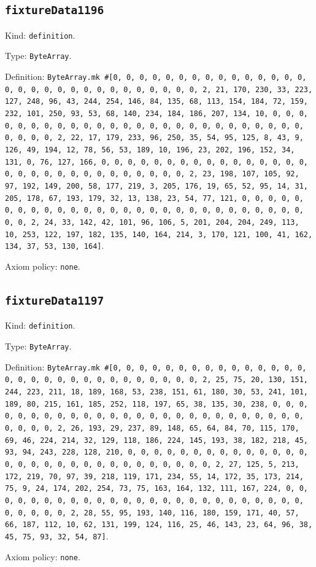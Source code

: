 \documentclass[11pt]{article}
\begin{document}
\subsection*{\texttt{fixtureData1196}}
\noindent Kind: \texttt{definition}.\par
\noindent Type: \texttt{ByteArray}.\par
\noindent Definition: \texttt{ByteArray.mk \#[0, 0, 0, 0, 0, 0, 0, 0, 0, 0, 0, 0, 0, 0, 0, 0, 0, 0, 0, 0, 0, 0, 0, 0, 0, 0, 0, 0, 0, 0, 2, 21, 170, 230, 33, 223, 127, 248, 96, 43, 244, 254, 146, 84, 135, 68, 113, 154, 184, 72, 159, 232, 101, 250, 93, 53, 68, 140, 234, 184, 186, 207, 134, 10, 0, 0, 0, 0, 0, 0, 0, 0, 0, 0, 0, 0, 0, 0, 0, 0, 0, 0, 0, 0, 0, 0, 0, 0, 0, 0, 0, 0, 0, 0, 2, 22, 17, 179, 233, 96, 250, 35, 54, 95, 125, 8, 43, 9, 126, 49, 194, 12, 78, 56, 53, 189, 10, 196, 23, 202, 196, 152, 34, 131, 0, 76, 127, 166, 0, 0, 0, 0, 0, 0, 0, 0, 0, 0, 0, 0, 0, 0, 0, 0, 0, 0, 0, 0, 0, 0, 0, 0, 0, 0, 0, 0, 0, 0, 2, 23, 198, 107, 105, 92, 97, 192, 149, 200, 58, 177, 219, 3, 205, 176, 19, 65, 52, 95, 14, 31, 205, 178, 67, 193, 179, 32, 13, 138, 23, 54, 77, 121, 0, 0, 0, 0, 0, 0, 0, 0, 0, 0, 0, 0, 0, 0, 0, 0, 0, 0, 0, 0, 0, 0, 0, 0, 0, 0, 0, 0, 0, 0, 2, 24, 33, 142, 42, 101, 96, 106, 5, 201, 204, 204, 249, 113, 10, 253, 122, 197, 182, 135, 140, 164, 214, 3, 170, 121, 100, 41, 162, 134, 37, 53, 130, 164]}.\par
\noindent Axiom policy: \texttt{none}.\par
\subsection*{\texttt{fixtureData1197}}
\noindent Kind: \texttt{definition}.\par
\noindent Type: \texttt{ByteArray}.\par
\noindent Definition: \texttt{ByteArray.mk \#[0, 0, 0, 0, 0, 0, 0, 0, 0, 0, 0, 0, 0, 0, 0, 0, 0, 0, 0, 0, 0, 0, 0, 0, 0, 0, 0, 0, 0, 0, 2, 25, 75, 20, 130, 151, 244, 223, 211, 18, 189, 168, 53, 238, 151, 61, 180, 30, 53, 241, 101, 189, 80, 215, 161, 185, 252, 118, 197, 65, 38, 135, 30, 238, 0, 0, 0, 0, 0, 0, 0, 0, 0, 0, 0, 0, 0, 0, 0, 0, 0, 0, 0, 0, 0, 0, 0, 0, 0, 0, 0, 0, 0, 0, 2, 26, 193, 29, 237, 89, 148, 65, 64, 84, 70, 115, 170, 69, 46, 224, 214, 32, 129, 118, 186, 224, 145, 193, 38, 182, 218, 45, 93, 94, 243, 228, 128, 210, 0, 0, 0, 0, 0, 0, 0, 0, 0, 0, 0, 0, 0, 0, 0, 0, 0, 0, 0, 0, 0, 0, 0, 0, 0, 0, 0, 0, 0, 0, 2, 27, 125, 5, 213, 172, 219, 70, 97, 39, 218, 119, 171, 234, 55, 14, 172, 35, 173, 214, 75, 9, 24, 174, 202, 254, 73, 75, 163, 164, 132, 111, 167, 224, 0, 0, 0, 0, 0, 0, 0, 0, 0, 0, 0, 0, 0, 0, 0, 0, 0, 0, 0, 0, 0, 0, 0, 0, 0, 0, 0, 0, 0, 0, 2, 28, 55, 95, 193, 140, 116, 180, 159, 171, 40, 57, 66, 187, 112, 10, 62, 131, 199, 124, 116, 25, 46, 143, 23, 64, 96, 38, 45, 75, 93, 32, 54, 87]}.\par
\noindent Axiom policy: \texttt{none}.\par
\end{document}
